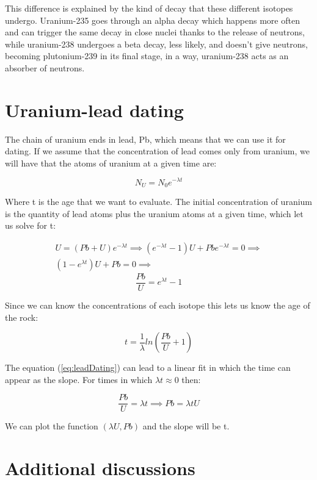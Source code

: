 \documentclass{article} %
\begin{document}
This difference is explained by the kind of decay that these different isotopes undergo. Uranium-235 goes through an alpha decay which happens more often and can trigger the same decay in close nuclei thanks to the release of neutrons, while uranium-238 undergoes a beta decay, less likely, and doesn't give neutrons, becoming plutonium-239 in its final stage, in a way, uranium-238 acts as an absorber of neutrons.

\section{Uranium-lead dating}

The chain of uranium ends in lead, Pb, which means that we can use it for dating. If we assume that the concentration of lead comes only from uranium, we will have that the atoms of uranium at a given time are:

$$
N_{U} = N_0 e^{-\lambda t}
$$

Where t is the age that we want to evaluate. The initial concentration of uranium is the quantity of lead atoms plus the uranium atoms at a given time, which let us solve for t:

\begin{align*}
U = (Pb + U)e^{-\lambda t} \implies \left( e^{-\lambda t} - 1 \right) U + Pb e^{-\lambda t} = 0 \implies \\ \left( 1 - e^{\lambda t} \right) U + Pb = 0 \implies
\end{align*}
\begin{equation}
\frac{Pb}{U} = e^{\lambda t} - 1
\label{eq:leadDating}
\end{equation}

Since we can know the concentrations of each isotope this lets us know the age of the rock:

\begin{equation}
t = \frac{1}{\lambda} ln \left( \frac{Pb}{U} + 1 \right)
\end{equation}

The equation (\ref{eq:leadDating}) can lead to a linear fit in which the time can appear as the slope. For times in which $\lambda t \approx 0$ then:

$$
\frac{Pb}{U} = \lambda t \implies Pb = \lambda t U
$$

We can plot the function $(\lambda U, Pb)$ and the slope will be t.

\section{Additional discussions}
\end{document}
